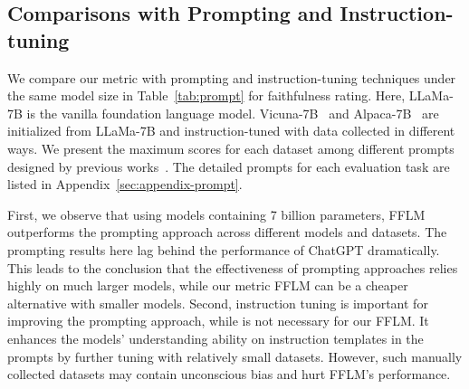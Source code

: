 


\subsection{Comparisons with Prompting and Instruction-tuning}
\label{sec:analysis-prompts}

We compare our metric with prompting and instruction-tuning techniques under the same model size in Table~\ref{tab:prompt} for faithfulness rating. Here, LLaMa-7B is the vanilla foundation language model. Vicuna-7B~\cite{vicuna2023} and Alpaca-7B~\cite{taori2023alpaca} are initialized from LLaMa-7B and instruction-tuned with data collected in different ways. We present the maximum scores for each dataset among different prompts designed by previous works~\cite{chen2023evaluating,gao2023human,luo2023chatgpt}. The detailed prompts for each evaluation task are listed in Appendix~\ref{sec:appendix-prompt}.




First, we observe that using models containing 7 billion parameters, FFLM outperforms the prompting approach across different models and datasets.
The prompting results here lag behind the performance of ChatGPT dramatically. This leads to the conclusion that the effectiveness of prompting approaches relies highly on much larger models, while our metric FFLM can be a cheaper alternative with smaller models.
Second, instruction tuning is important for improving the prompting approach, while is not necessary for our FFLM. It enhances the models' understanding ability on instruction templates in the prompts by further tuning with relatively small datasets. However, such manually collected datasets may contain unconscious bias and hurt FFLM's performance.